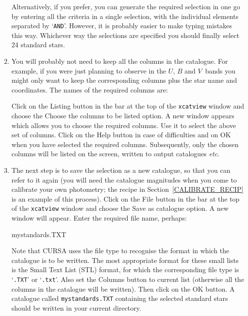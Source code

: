 \documentclass[twoside,11pt,nolof]{starlink}
\begin{document}
\begin{enumerate}
   Alternatively, if you prefer, you can generate the required selection
   in one go by entering all the criteria in a single selection, with
   the individual elements separated by `\texttt{AND}'.  However, it is
   probably easier to make typing mistakes this way.  Whichever way the
   selections are specified you should finally select 24 standard stars.

  \item You will probably not need to keep all the columns in the
   catalogue.  For example, if you were just planning to observe in
   the $U$, $B$ and $V$\, bands you might only want to keep the
   corresponding columns plus the star name and coordinates.  The names
   of the required columns are:

\begin{terminalv}
NAME
RA
DEC
V
B_V
U_B}
\end{terminalv}

   Click on the \textsf{Listing} button in the bar at the top of the \texttt{xcatview} window and choose the \textsf{Choose the columns to be listed}
   option.  A new window appears which allows you to choose the
   required columns.  Use it to select the above set of columns.  Click
   on the \textsf{Help} button in case of difficulties and on \textsf{OK}
   when you have selected the required columns.  Subsequently, only the
   chosen columns will be listed on the screen, written to output
   catalogues \emph{etc}.

  \item The next step is to save the selection as a new catalogue, so
   that you can refer to it again (you will need the catalogue magnitudes
   when you come to calibrate your own photometry; the recipe in
   Section~\ref{CALIBRATE_RECIP} is an example of this process).
   Click on the \textsf{File} button in the bar at the top of the \texttt{xcatview} window and choose the \textsf{Save as catalogue} option.  A
   new window will appear.  Enter the required file name, perhaps:

\begin{terminalv}
mystandards.TXT
\end{terminalv}

   Note that CURSA uses the file type to recognise the format in which
   the catalogue is to be written.  The most appropriate format for
   these small lists is the Small Text List (STL) format, for which the
   corresponding file type is `\texttt{.TXT}' or `\texttt{.txt}'.  Also set
   the \textsf{Columns} button to \textsf{current list} (otherwise all the
   columns in the catalogue will be written).  Then click on the \textsf{OK}
   button.  A catalogue called \texttt{mystandards.TXT} containing the
   selected standard stars should be written in your current directory.


\end{enumerate}
\end{document}
